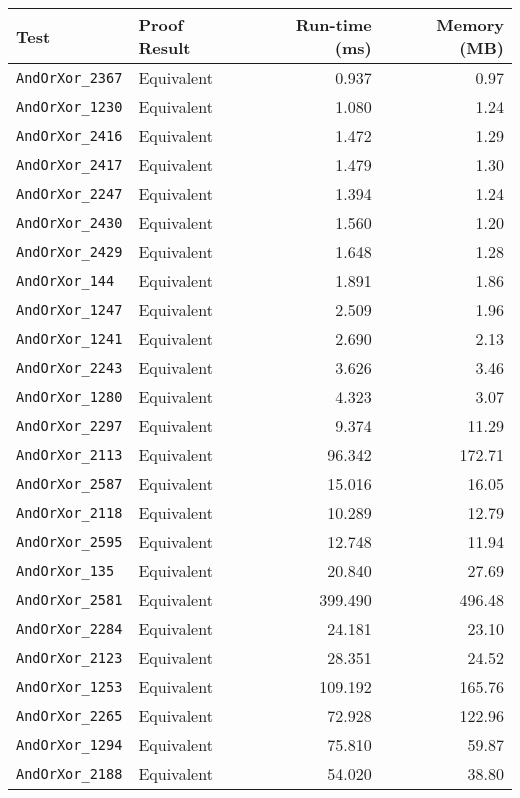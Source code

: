 \begin{tabular}{llrr}
\toprule
\textbf{Test} & \textbf{Proof Result} & \textbf{Run-time (ms)} & \textbf{Memory (MB)} \\
\midrule
\texttt{AndOrXor\_2367} & Equivalent & 0.937 & 0.97 \\
\texttt{AndOrXor\_1230} & Equivalent & 1.080 & 1.24 \\
\texttt{AndOrXor\_2416} & Equivalent & 1.472 & 1.29 \\
\texttt{AndOrXor\_2417} & Equivalent & 1.479 & 1.30 \\
\texttt{AndOrXor\_2247} & Equivalent & 1.394 & 1.24 \\
\texttt{AndOrXor\_2430} & Equivalent & 1.560 & 1.20 \\
\texttt{AndOrXor\_2429} & Equivalent & 1.648 & 1.28 \\
\texttt{AndOrXor\_144} & Equivalent & 1.891 & 1.86 \\
\texttt{AndOrXor\_1247} & Equivalent & 2.509 & 1.96 \\
\texttt{AndOrXor\_1241} & Equivalent & 2.690 & 2.13 \\
\texttt{AndOrXor\_2243} & Equivalent & 3.626 & 3.46 \\
\texttt{AndOrXor\_1280} & Equivalent & 4.323 & 3.07 \\
\texttt{AndOrXor\_2297} & Equivalent & 9.374 & 11.29 \\
\texttt{AndOrXor\_2113} & Equivalent & 96.342 & 172.71 \\
\texttt{AndOrXor\_2587} & Equivalent & 15.016 & 16.05 \\
\texttt{AndOrXor\_2118} & Equivalent & 10.289 & 12.79 \\
\texttt{AndOrXor\_2595} & Equivalent & 12.748 & 11.94 \\
\texttt{AndOrXor\_135} & Equivalent & 20.840 & 27.69 \\
\texttt{AndOrXor\_2581} & Equivalent & 399.490 & 496.48 \\
\texttt{AndOrXor\_2284} & Equivalent & 24.181 & 23.10 \\
\texttt{AndOrXor\_2123} & Equivalent & 28.351 & 24.52 \\
\texttt{AndOrXor\_1253} & Equivalent & 109.192 & 165.76 \\
\texttt{AndOrXor\_2265} & Equivalent & 72.928 & 122.96 \\
\texttt{AndOrXor\_1294} & Equivalent & 75.810 & 59.87 \\
\texttt{AndOrXor\_2188} & Equivalent & 54.020 & 38.80 \\

\end{tabular}
